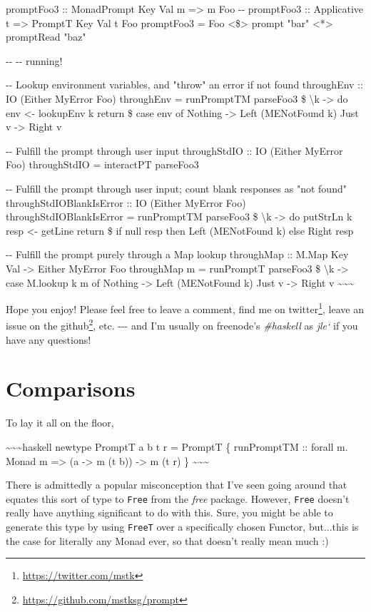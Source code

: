 \documentclass[]{article}
\renewcommand{\href}[2]{#2\footnote{\url{#1}}}
\begin{document}
promptFoo3 :: MonadPrompt Key Val m =\textgreater{} m Foo -\/- promptFoo3 ::
Applicative t =\textgreater{} PromptT Key Val t Foo promptFoo3 = Foo
\textless{}\$\textgreater{} prompt "bar" \textless{}*\textgreater{} promptRead
"baz"

-\/- -\/- running!

-\/- Lookup environment variables, and "throw" an error if not found throughEnv
:: IO (Either MyError Foo) throughEnv = runPromptTM parseFoo3 \$
\textbackslash{}k -\textgreater{} do env \textless{}- lookupEnv k return \$ case
env of Nothing -\textgreater{} Left (MENotFound k) Just v -\textgreater{} Right
v

-\/- Fulfill the prompt through user input throughStdIO :: IO (Either MyError
Foo) throughStdIO = interactPT parseFoo3

-\/- Fulfill the prompt through user input; count blank responses as "not found"
throughStdIOBlankIsError :: IO (Either MyError Foo) throughStdIOBlankIsError =
runPromptTM parseFoo3 \$ \textbackslash{}k -\textgreater{} do putStrLn k resp
\textless{}- getLine return \$ if null resp then Left (MENotFound k) else Right
resp

-\/- Fulfill the prompt purely through a Map lookup throughMap :: M.Map Key Val
-\textgreater{} Either MyError Foo throughMap m = runPromptT parseFoo3 \$
\textbackslash{}k -\textgreater{} case M.lookup k m of Nothing -\textgreater{}
Left (MENotFound k) Just v -\textgreater{} Right v
\textasciitilde{}\textasciitilde{}\textasciitilde{}

Hope you enjoy! Please feel free to leave a comment, find me on
\href{https://twitter.com/mstk}{twitter}, leave an issue on the
\href{https://github.com/mstksg/prompt}{github}, etc. -\/-\/- and I'm usually on
freenode's \emph{\#haskell} as \emph{jle`} if you have any questions!

\section{Comparisons}

To lay it all on the floor,

\textasciitilde{}\textasciitilde{}\textasciitilde{}haskell newtype PromptT a b t
r = PromptT \{ runPromptTM :: forall m. Monad m =\textgreater{} (a
-\textgreater{} m (t b)) -\textgreater{} m (t r) \}
\textasciitilde{}\textasciitilde{}\textasciitilde{}

There is admittedly a popular misconception that I've seen going around that
equates this sort of type to \texttt{Free} from the \emph{free} package.
However, \texttt{Free} doesn't really have anything significant to do with this.
Sure, you might be able to generate this type by using \texttt{FreeT} over a
specifically chosen Functor, but...this is the case for literally any Monad
ever, so that doesn't really mean much :)
\end{document}

